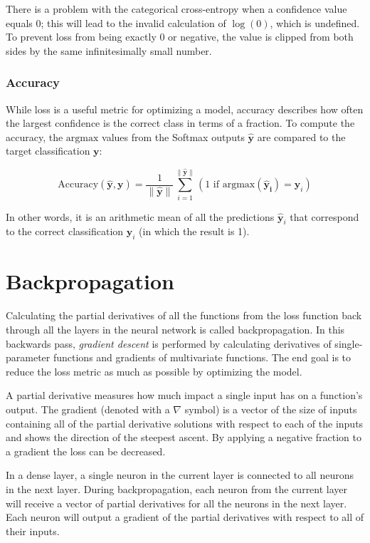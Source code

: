 \documentclass[a4paper]{article}
\newcommand{\vect}[1]{\bm{#1}}
\newcommand{\argmax}{\text{argmax}}
\begin{document}
There is a problem with the categorical cross-entropy when a confidence value equals $0$; this will 
lead to the invalid calculation of $\log(0)$, which is undefined. To prevent loss from being exactly $0$ or negative, the value is clipped from both sides by the same infinitesimally small number.

\subsubsection*{Accuracy}
While loss is a useful metric for optimizing a model, accuracy describes how often the largest 
confidence is the correct class in terms of a fraction. To compute the accuracy, the $\text{argmax}$ values from the Softmax outputs $\vect{\hat{y}}$ are compared to the target classification $\vect{y}$:

\begin{equation*}
    \text{Accuracy}(\vect{\hat{y}},\vect{y}) = \frac{1}{\|\vect{\hat{y}}\|} \sum_{i=1}^{\|\vect{\hat{y}}\|}(1 \text{ if } \argmax(\vect{\hat{y}_i}) = \vect{y}_i)
\end{equation*}

In other words, it is an arithmetic mean of all the predictions $\vect{\hat{y}}_i$ that correspond to the correct classification $\vect{y}_i$ (in which the result is 1).

\section*{Backpropagation}
Calculating the partial derivatives of all the functions from the loss function back through all the
layers in the neural network is called backpropagation. In this backwards pass, \emph{gradient descent} is performed by calculating derivatives of single-parameter functions and gradients of multivariate functions. The end goal is to reduce the loss metric as much as possible by optimizing the model.

A partial derivative measures how much impact a single input has on a function's output. The gradient (denoted with a $\nabla$ symbol) is a vector of the size of inputs containing all of the partial derivative solutions with respect to each of the inputs and shows the direction of the steepest ascent. By applying a negative fraction to a gradient the loss can be decreased.

In a dense layer, a single neuron in the current layer is connected to all neurons in the next 
layer. During backpropagation, each neuron from the current layer will receive a vector of partial 
derivatives for all the neurons in the next layer. Each neuron will output a gradient of the partial derivatives with respect to all of their inputs.
\end{document}
